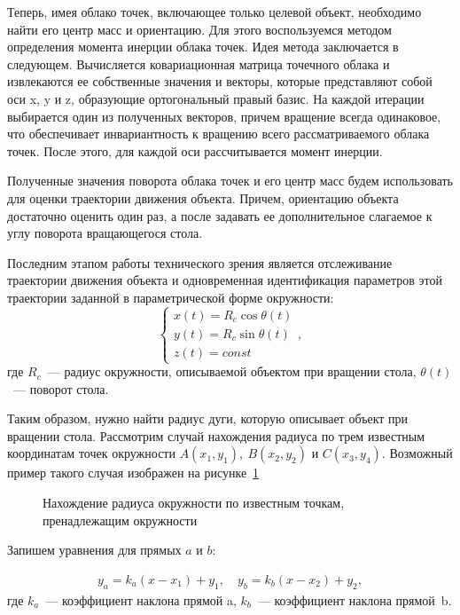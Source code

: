 Теперь, имея облако точек, включающее только целевой объект, необходимо найти его центр масс и ориентацию. Для этого воспользуемся методом определения момента инерции облака точек. Идея метода заключается в следующем. Вычисляется ковариационная матрица точечного облака и извлекаются ее собственные значения и векторы, которые представляют собой оси x, y и z, образующие ортогональный правый базис. На каждой итерации выбирается один из полученных векторов, причем вращение всегда одинаковое, что обеспечивает инвариантность к вращению всего рассматриваемого облака точек. После этого, для каждой оси рассчитывается момент инерции.

Полученные значения поворота облака точек и его центр масс будем использовать для оценки траектории движения объекта. Причем, ориентацию объекта достаточно оценить один раз, а после задавать ее дополнительное слагаемое к углу поворота вращающегося стола.

Последним этапом работы технического зрения является отслеживание траектории движения объекта и одновременная идентификация параметров этой траектории заданной в параметрической форме окружности:
\begin{equation}
\begin{cases}
	x(t) = R_c \cos{\theta(t)}\\
	y(t) = R_c \sin{\theta(t)} \\
	z(t) = const
\end{cases}\!\!\!\!\!\!\!\!,
\end{equation}
где $ R_c $~--- радиус окружности, описываемой объектом при вращении стола, $ \theta(t) $~--- поворот стола.

Таким образом, нужно найти радиус дуги, которую описывает объект при вращении стола.
Рассмотрим случай нахождения радиуса по трем известным координатам точек окружности $ A(x_1,y_1),\: B(x_2, y_2) $ и $ C(x_3, y_4) $. Возможный пример такого случая изображен на рисунке~\ref{img:circle} 

\begin{figure}[h!]
	\vspace{0.5cm}
	\caption{Нахождение радиуса окружности по известным точкам, пренадлежащим окружности}
	\label{img:circle}
\end{figure}

Запишем уравнения для прямых $ a $ и $ b $:

\begin{gather}
	y_a = k_a (x - x_1) + y_1, \quad y_b = k_b (x - x_2) + y_2,
\end{gather}
где $ k_a$~--- коэффициент наклона прямой a, $ k_b $~--- коэффициент наклона прямой~b.

